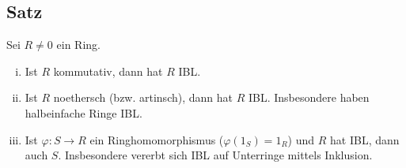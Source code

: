 \subsection[Satz: Kommutative, noethersche Ringe und Urbilder von Ringhomom. haben IBL]{Satz} %
\label{sub:241}
Sei $R \not= 0$ ein Ring.
\begin{enumerate}[(i)]
	\item Ist $R$ kommutativ, dann hat $R$ IBL.
	\item Ist $R$ noethersch (bzw. artinsch), dann hat $R$ IBL. Insbesondere haben halbeinfache Ringe IBL.
	\item Ist $\varphi : S \to R$ ein Ringhomomorphismus ($\varphi(1_S)=1_R$) und $R$ hat IBL, dann auch $S$. Insbesondere vererbt sich IBL auf Unterringe mittels Inklusion.
\end{enumerate}
